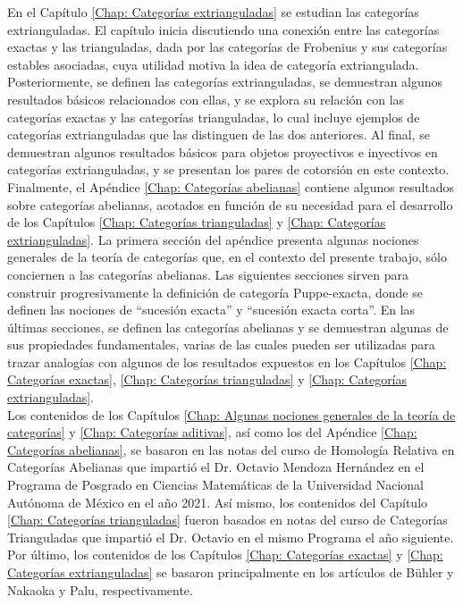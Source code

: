 \documentclass[tesis]{subfiles}
\begin{document}
En el Capítulo \ref{Chap: Categorías extrianguladas} se estudian las categorías extrianguladas. El capítulo inicia discutiendo una conexión entre las categorías exactas y las trianguladas, dada por las categorías de Frobenius y sus categorías estables asociadas, cuya utilidad motiva la idea de categoría extriangulada. Posteriormente, se definen las categorías extrianguladas, se demuestran algunos resultados básicos relacionados con ellas, y se explora su relación con las categorías exactas y las categorías trianguladas, lo cual incluye ejemplos de categorías extrianguladas que las distinguen de las dos anteriores. Al final, se demuestran algunos resultados básicos para objetos proyectivos e inyectivos en categorías extrianguladas, y se presentan los pares de cotorsión en este contexto. \\

Finalmente, el Apéndice \ref{Chap: Categorías abelianas} contiene algunos resultados sobre categorías abelianas, acotados en función de su necesidad para el desarrollo de los Capítulos \ref{Chap: Categorías trianguladas} y \ref{Chap: Categorías extrianguladas}. La primera sección del apéndice presenta algunas nociones generales de la teoría de categorías que, en el contexto del presente trabajo, sólo conciernen a las categorías abelianas. Las siguientes secciones sirven para construir progresivamente la definición de categoría Puppe-exacta, donde se definen las nociones de ``sucesión exacta'' y ``sucesión exacta corta''. En las últimas secciones, se definen las categorías abelianas y se demuestran algunas de sus propiedades fundamentales, varias de las cuales pueden ser utilizadas para trazar analogías con algunos de los resultados expuestos en los Capítulos \ref{Chap: Categorías exactas}, \ref{Chap: Categorías trianguladas} y \ref{Chap: Categorías extrianguladas}. \\

Los contenidos de los Capítulos \ref{Chap: Algunas nociones generales de la teoría de categorías} y \ref{Chap: Categorías aditivas}, así como los del Apéndice \ref{Chap: Categorías abelianas}, se basaron en las notas del curso de Homología Relativa en Categorías Abelianas que impartió el Dr. Octavio Mendoza Hernández en el Programa de Posgrado en Ciencias Matemáticas de la Universidad Nacional Autónoma de México en el año 2021. Así mismo, los contenidos del Capítulo \ref{Chap: Categorías trianguladas} fueron basados en notas del curso de Categorías Trianguladas que impartió el Dr. Octavio en el mismo Programa el año siguiente. Por último, los contenidos de los Capítulos \ref{Chap: Categorías exactas} y \ref{Chap: Categorías extrianguladas} se basaron principalmente en los artículos de Bühler\cite{Bühler} y Nakaoka y Palu\cite{NakaokaPalu}, respectivamente. %
\end{document}
